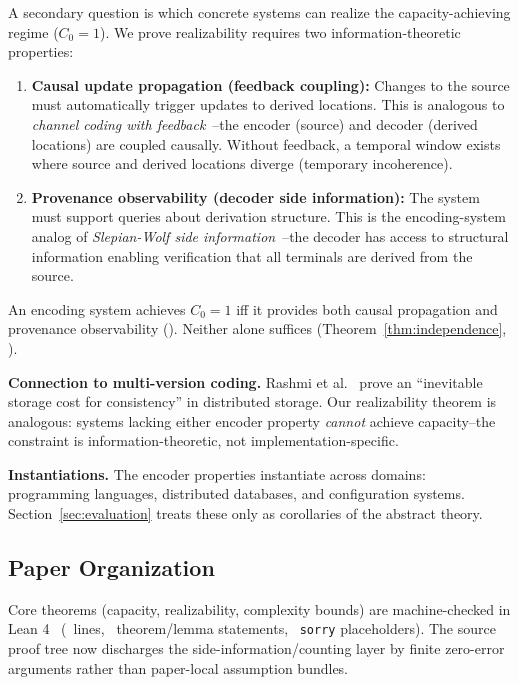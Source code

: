 A secondary question is which concrete systems can realize the capacity-achieving regime ($C_0 = 1$). We prove realizability requires two information-theoretic properties:

\begin{enumerate}
\item \textbf{Causal update propagation (feedback coupling):} Changes to the source must automatically trigger updates to derived locations. This is analogous to \emph{channel coding with feedback}~\cite{cover2006elements}--the encoder (source) and decoder (derived locations) are coupled causally. Without feedback, a temporal window exists where source and derived locations diverge (temporary incoherence).

\item \textbf{Provenance observability (decoder side information):} The system must support queries about derivation structure. This is the encoding-system analog of \emph{Slepian-Wolf side information}~\cite{slepian1973noiseless}--the decoder has access to structural information enabling verification that all terminals are derived from the source.
\end{enumerate}

\begin{theorem}
An encoding system achieves $C_0 = 1$ iff it provides both causal propagation and provenance observability (). Neither alone suffices (Theorem~\ref{thm:independence}, ).
\end{theorem}

\textbf{Connection to multi-version coding.} Rashmi et al.~\cite{rashmi2015multiversion} prove an ``inevitable storage cost for consistency'' in distributed storage. Our realizability theorem is analogous: systems lacking either encoder property \emph{cannot} achieve capacity--the constraint is information-theoretic, not implementation-specific.

\textbf{Instantiations.} The encoder properties instantiate across domains: programming languages, distributed databases, and configuration systems. Section~\ref{sec:evaluation} treats these only as corollaries of the abstract theory.

\subsection{Paper Organization}\label{overview}

Core theorems (capacity, realizability, complexity bounds) are machine-checked in Lean 4~\cite{demoura2021lean4} (\LeanTotalLines\ lines, \LeanTotalTheorems\ theorem/lemma statements, \LeanTotalSorry\ \texttt{sorry} placeholders). The source proof tree now discharges the side-information/counting layer by finite zero-error arguments rather than paper-local assumption bundles.

